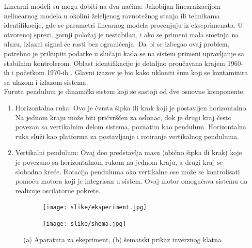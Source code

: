 \documentclass[a4paper,11pt]{article}
\theoremstyle{definition} \newtheorem{deff}{Definicija}[section]
\theoremstyle{definition} \newtheorem{prim}[deff]{Primer}
\theoremstyle{plain} \newtheorem{teor}[deff]{Teorema}
\begin{document}
	Linearni modeli su mogu dobiti na dva načina: Jakobijan linearnizacijom nelinearnog modela u okolini želeljenog ravnotežnog stanja ili tehnikama identifikacije, gde se parametri linearnog modela procenjuju iz ekseprimenata. U otvorenoj sprezi, gornji položaj je nestabilan, i ako se primeni mala smetnja na ulazu, izlazni signal će rasti bez ograničenja. Da bi se izbegao ovaj problem, potrebno je prikupiti podatke u slučaju kada se na sistem primeni upravljanje sa stabilnim kontrolerom.  Oblast identifikacije je detaljno proučavana krajem 1960-ih i početkom 1970-ih  \cite{identifikacija}. Glavni izazov je bio kako ukloniti šum koji se kontaminira sa ulazom i izlazom sistema.  \\
	
	
	Furuta pendulum je dinamički sistem koji se sastoji od dve osnovne komponente: \\
	
	\begin{enumerate}
		\item Horizontalna ruka: Ovo je čvrsta šipka ili krak koji je postavljen horizontalno. Na jednom kraju može biti pričvršćen za oslonac, dok je drugi kraj često povezan sa vertikalnim delom sistema, poznatim kao pendulum. Horizontalna ruka služi kao platforma za postavljanje i rotiranje vertikalnog penduluma. \\
		
		\item Vertikalni pendulum: Ovaj deo predstavlja masu (obično šipka ili krak) koje je povezano sa horizontalnom rukom na jednom kraju, a drugi kraj se slobodno kreće. Rotacija penduluma oko vertikalne ose može se kontrolisati pomoću motora koji je integrisan u sistem. Ovaj motor omogućava sistemu da realizuje oscilatorne pokrete.\\
		
	\end{enumerate}
	
	
	\begin{figure}[!htb]
		\centering
		\begin{subfigure}{0.3\linewidth}
			\centering
			\texttt{[image: slike/eksperiment.jpg]}
			\caption{}
			\label{fig:eksper}
		\end{subfigure}
		\hfill
		\begin{subfigure}{0.5\linewidth}
			\centering
			\texttt{[image: slike/shema.jpg]}
			\caption{}
			\label{fig:schema}
		\end{subfigure}
		\caption{(a) Aparatura za ekepriment, (b) šematski prikaz inverznog klatna \cite{inicijalna} }
	\end{figure}
	
\end{document}
